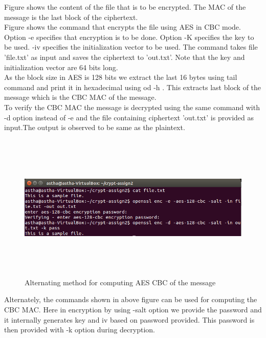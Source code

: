 \documentclass{article}
\begin{document}
\noindent Figure shows the content of the file that is to be encrypted. The MAC of the message is the last block of the ciphertext.\\

\noindent Figure shows the command that encrypts the file using AES in CBC mode. Option -e specifies that encryption is to be done. Option -K specifies the key to be used. -iv specifies the initialization vector to be used. The command takes file 'file.txt' as input and saves the ciphertext to 'out.txt'. Note that the key and initialization vector are 64 bits long.\\

\noindent As the block size in AES is 128 bits we extract the last 16 bytes using tail command and print it in hexadecimal using od -h . This extracts last block of the message which is the CBC MAC of the message.\\

\noindent To verify the CBC MAC the message is decrypted using the same command with -d option instead of -e and the file containing ciphertext 'out.txt' is provided as input.The output is observed to be same as the plaintext.


	\begin{figure}[h]
	    \begin{center}
		\includegraphics[width=15cm,height=7cm]{question1b2.png}
		\caption{Alternating method for computing AES CBC of the message}
	     \end{center}
	\end{figure}


\noindent Alternately, the commands shown in above figure can be used for computing the CBC MAC. Here in encryption by using -salt option we provide the password and it internally generates key and iv based on password provided. This password is then provided with -k option during decryption.
\end{document}
